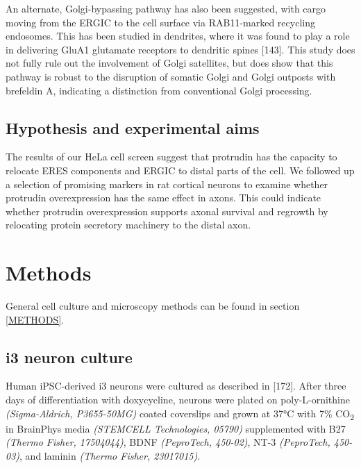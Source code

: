 \documentclass[
  12pt,
  a4paper,
]{book}
\begin{document}
An alternate, Golgi-bypassing pathway has also been suggested, with cargo moving from the ERGIC to the cell surface via RAB11-marked recycling endosomes. This has been studied in dendrites, where it was found to play a role in delivering GluA1 glutamate receptors to dendritic spines {[}143{]}. This study does not fully rule out the involvement of Golgi satellites, but does show that this pathway is robust to the disruption of somatic Golgi and Golgi outposts with brefeldin A, indicating a distinction from conventional Golgi processing.

\hypertarget{hypothesis-and-experimental-aims-2}{%
\subsection{Hypothesis and experimental aims}\label{hypothesis-and-experimental-aims-2}}

The results of our HeLa cell screen suggest that protrudin has the capacity to relocate ERES components and ERGIC to distal parts of the cell. We followed up a selection of promising markers in rat cortical neurons to examine whether protrudin overexpression has the same effect in axons. This could indicate whether protrudin overexpression supports axonal survival and regrowth by relocating protein secretory machinery to the distal axon.

\hypertarget{methods-2}{%
\section{Methods}\label{methods-2}}

General cell culture and microscopy methods can be found in section \ref{METHODS}.

\hypertarget{i3-neuron-culture}{%
\subsection{i3 neuron culture}\label{i3-neuron-culture}}

Human iPSC-derived i3 neurons were cultured as described in {[}172{]}. After three days of differentiation with doxycycline, neurons were plated on poly-L-ornithine \emph{(Sigma-Aldrich, P3655-50MG)} coated coverslips and grown at 37°C with 7\% CO\textsubscript{2} in BrainPhys media \emph{(STEMCELL Technologies, 05790)} supplemented with B27 \emph{(Thermo Fisher, 17504044)}, BDNF \emph{(PeproTech, 450-02)}, NT-3 \emph{(PeproTech, 450-03)}, and laminin \emph{(Thermo Fisher, 23017015)}.
\end{document}
